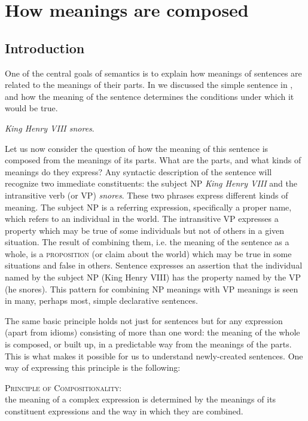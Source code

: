 \chapter{How meanings are composed}\label{sec:12}

\section{Introduction}\label{sec:12.1}

One of the central goals of semantics is to explain how meanings of sentences are related to the meanings of their parts. In  we discussed the simple sentence in , and how the meaning of the sentence determines the conditions under which it would be true.


\ea \label{ex:12.1}
\textit{King Henry VIII snores}.
\z


Let us now consider the question of how the meaning of this sentence is composed from the meanings of its parts. What are the parts, and what kinds of meanings do they express? Any syntactic description of the sentence will recognize two immediate constituents: the subject NP \textit{King Henry VIII} and the intransitive verb (or VP) \textit{snores}. These two phrases express different kinds of meaning. The subject NP is a referring expression, specifically a proper name, which refers to an individual in the world. The intransitive VP expresses a property which may be true of some individuals but not of others in a given situation. The result of combining them, i.e. the meaning of the sentence as a whole, is a \textsc{proposition} (or claim about the world) which may be true in some situations and false in others. Sentence  expresses an assertion that the individual named by the subject NP (King Henry VIII) has the property named by the VP (he snores). This pattern for combining NP meanings with VP meanings is seen in many, perhaps most, simple declarative sentences.



The same basic principle holds not just for sentences but for any expression (apart from idioms) consisting of more than one word: the meaning of the whole is composed, or built up, in a predictable way from the meanings of the parts. This is what makes it possible for us to understand newly-created sentences. One way of expressing this principle is the following:


\ea \label{ex:12.2}
\textsc{Principle of Compositionality:}\\
the meaning of a complex expression is determined by the meanings of its constituent expressions and the way in which they are combined.
\z 


